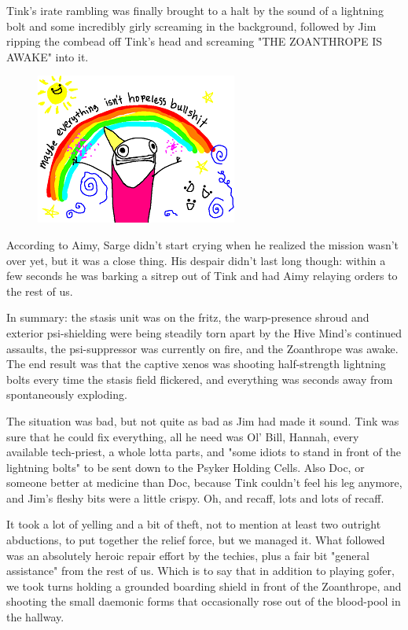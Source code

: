 Tink's irate rambling was finally brought to a halt by the sound of a lightning bolt and some incredibly girly screaming in the background, followed by Jim ripping the combead off Tink's head and screaming "THE ZOANTHROPE IS AWAKE" into it.
\begin{figure}
	\begin{center}
		\includegraphics[width=\figwidth]{pics/12/75.png}
	\end{center}
\end{figure}
According to Aimy, Sarge didn't start crying when he realized the mission wasn't over yet, but it was a close thing. 
His despair didn't last long though: 
within a few seconds he was barking a sitrep out of Tink and had Aimy relaying orders to the rest of us.

In summary: 
the stasis unit was on the fritz, the warp-presence shroud and exterior psi-shielding were being steadily torn apart by the Hive Mind's continued assaults, the psi-suppressor was currently on fire, and the Zoanthrope was awake. 
The end result was that the captive xenos was shooting half-strength lightning bolts every time the stasis field flickered, and everything was seconds away from spontaneously exploding.

The situation was bad, but not quite as bad as Jim had made it sound. 
Tink was sure that he could fix everything, all he need was Ol' Bill, Hannah, every available tech-priest, a whole lotta parts, and "some idiots to stand in front of the lightning bolts" to be sent down to the Psyker Holding Cells. 
Also Doc, or someone better at medicine than Doc, because Tink couldn't feel his leg anymore, and Jim's fleshy bits were a little crispy. 
Oh, and recaff, lots and lots of recaff.

It took a lot of yelling and a bit of theft, not to mention at least two outright abductions, to put together the relief force, but we managed it. 
What followed was an absolutely heroic repair effort by the techies, plus a fair bit "general assistance" from the rest of us. 
Which is to say that in addition to playing gofer, we took turns holding a grounded boarding shield in front of the Zoanthrope, and shooting the small daemonic forms that occasionally rose out of the blood-pool in the hallway.

